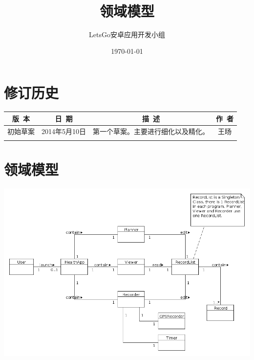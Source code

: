 \documentclass [a4paper,11pt]{article}
\title{领域模型}
\date{\today}
\author{LetsGo安卓应用开发小组}
\begin{document}
	
\maketitle
\section*{修订历史}

\begin{table}[!hbp]
\centering

\begin{tabular*}{\textwidth}{c|c|c|c}
\hline
\rule{0pt}{0.8cm}
版~本 & 日~期 & 描~述 & 作~者\\
\hline
\rule{0pt}{0.6cm}
初始草案 & 2014年5月10日 & 第一个草案。主要进行细化以及精化。 & 王旸\\
\hline
\rule{0pt}{0.6cm}
 &  &  & \\
\hline
\end{tabular*}
\end{table}


\section*{领域模型}	
\includegraphics[width=\textwidth]{../domainmodel1.png}

  
\end{document}

